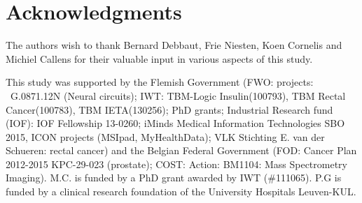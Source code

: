 \documentclass[twoside,11pt]{article}
\begin{document}
\section*{Acknowledgments}
The authors wish to thank Bernard Debbaut, Frie Niesten, Koen Cornelis and Michiel Callens for their valuable input in various aspects of this study. 

This study was supported by the Flemish Government (FWO: projects:  G.0871.12N (Neural circuits); IWT: TBM-Logic Insulin(100793), TBM Rectal Cancer(100783), TBM IETA(130256); PhD grants; Industrial Research fund (IOF): IOF Fellowship 13-0260; iMinds Medical Information Technologies SBO 2015, ICON projects (MSIpad, MyHealthData); VLK Stichting E. van der Schueren: rectal cancer) and the Belgian Federal Government (FOD: Cancer Plan 2012-2015 KPC-29-023 (prostate); COST: Action: BM1104: Mass Spectrometry Imaging). M.C. is funded by a PhD grant awarded by IWT (\#111065). P.G is funded by a clinical research foundation of the University Hospitals Leuven-KUL.  



\end{document}
